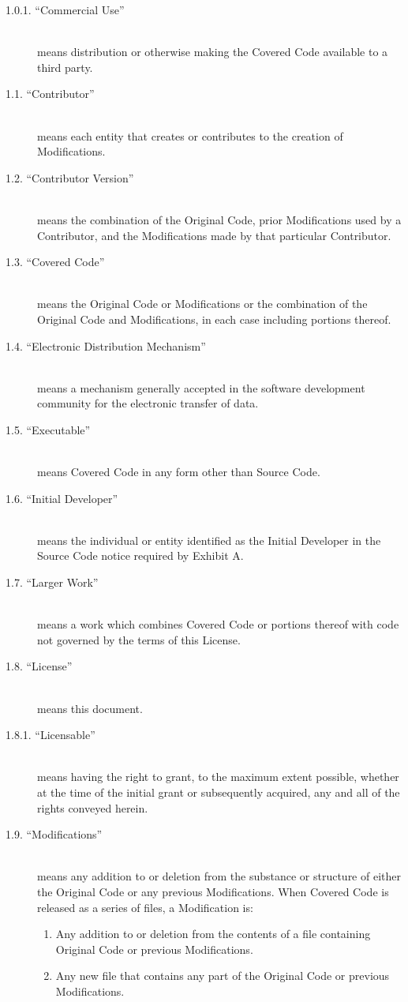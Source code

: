 \documentclass[letterpaper,colorlinks=true,linkcolor=blue]{book}
\begin{document}
\begin{description}
\item [1.0.1. ``Commercial Use'']\mbox{}\\
means distribution or otherwise making the Covered Code available to a third party. 
\item [1.1. ``Contributor'']\mbox{}\\
means each entity that creates or contributes to the creation of Modifications. 
\item [1.2. ``Contributor Version'']\mbox{}\\
means the combination of the Original Code, prior Modifications used by a Contributor, and the Modifications made by that particular Contributor. 
\item [1.3. ``Covered Code'']\mbox{}\\
means the Original Code or Modifications or the combination of the Original Code and Modifications, in each case including portions thereof. 
\item [1.4. ``Electronic Distribution Mechanism'']\mbox{}\\
means a mechanism generally accepted in the software development community for the electronic transfer of data. 
\item [1.5. ``Executable'']\mbox{}\\
means Covered Code in any form other than Source Code. 
\item [1.6. ``Initial Developer'']\mbox{}\\
means the individual or entity identified as the Initial Developer in the Source Code notice required by Exhibit A. 
\item [1.7. ``Larger Work'']\mbox{}\\
means a work which combines Covered Code or portions thereof with code not governed by the terms of this License. 
\item [1.8. ``License'']\mbox{}\\
means this document. 
\item [1.8.1. ``Licensable'']\mbox{}\\
means having the right to grant, to the maximum extent possible, whether at the time of the initial grant or subsequently acquired, any and all of the rights conveyed herein. 
\item [1.9. ``Modifications'']\mbox{}\\
means any addition to or deletion from the substance or structure of either the Original Code or any previous Modifications. When Covered Code is released as a series of files, a Modification is: 
\renewcommand{\theenumi}{\alph{enumi}}
\begin{enumerate}
\item Any addition to or deletion from the contents of a file containing Original Code or previous Modifications. 
\item Any new file that contains any part of the Original Code or previous Modifications. 
\end{enumerate}


\end{description}
\end{document}
